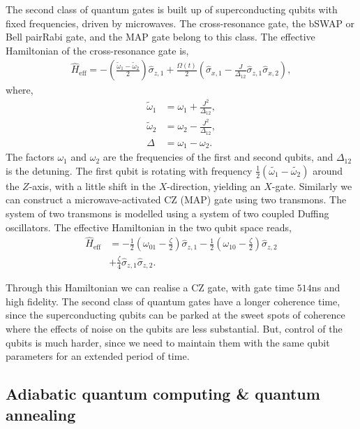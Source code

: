The second class of quantum gates is built up of superconducting qubits with fixed frequencies, driven by microwaves. The cross-resonance gate, the bSWAP or Bell pairRabi gate, and the MAP gate belong to this class. The effective Hamiltonian of the cross-resonance gate is,
\begin{align}
\hat{H}_\mathrm{eff} = - \left( \frac{\tilde{\omega}_{1} - \tilde{\omega}_2}{2} \right) \hat\sigma_{z,1} + \frac{\Omega(t)}{2} \left(\hat\sigma_{x,1} - \frac{J}{\Delta_{12}} \hat\sigma_{z,1} \hat\sigma_{x,2} \right),
\end{align}
where,
\begin{align}
	\tilde{\omega}_{1} &= \omega_{1} + \frac{J^{2}}{\Delta_{12}}, \nonumber\\
		\tilde{\omega}_{2} &= \omega_{2} - \frac{J^{2}}{\Delta_{12}}, \nonumber\\
\Delta &= \omega_{1} -\omega_{2}.		
\end{align}
The factors $\omega_{1}$ and $\omega_{2}$ are the frequencies of the first and second qubits, and $\Delta_{12}$ is the detuning. The first qubit is rotating with frequency $\frac{1}{2}(\tilde{\omega_{1}} - \tilde{\omega_{2}})$ around the $Z$-axis, with a little shift in the $X$-direction, yielding an $X$-gate. Similarly we can construct a microwave-activated CZ (MAP) gate using two transmons. The system of two transmons is modelled using a system of two coupled Duffing oscillators. The effective Hamiltonian in the two qubit space reads,
\begin{align}
\hat{H}_\mathrm{eff} &= - \frac{1}{2} \left( \omega_{01} - \frac{\zeta}{2} \right) \hat\sigma_{z,1} - \frac{1}{2} \left( \omega_{10} - \frac{\zeta}{2} \right) \hat\sigma_{z,2} \nonumber\\
&+ \frac{\zeta}{4} \hat\sigma_{z,1} \hat\sigma_{z,2}. 
\end{align}

Through this Hamiltonian we can realise a CZ gate, with gate time $514$ns and high fidelity. The second class of quantum gates have a longer coherence time, since the superconducting qubits can be parked at the sweet spots of coherence where the effects of noise on the qubits are less substantial. But, control of the qubits is much harder, since we need to maintain them with the same qubit parameters for an extended period of time.

%
%

\subsection{Adiabatic quantum computing \& quantum annealing}

